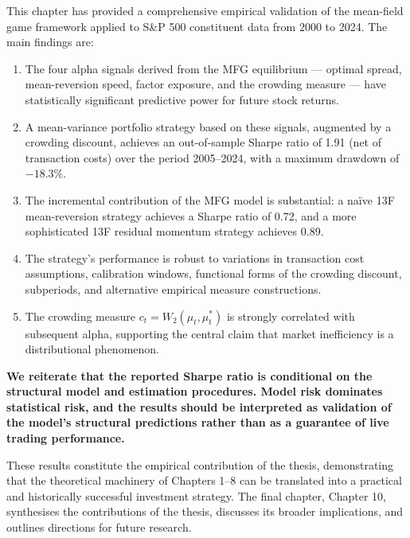 This chapter has provided a comprehensive empirical validation of the mean-field
game framework applied to S\&P 500 constituent data from 2000 to 2024. The main
findings are:

\begin{enumerate}
    \item The four alpha signals derived from the MFG equilibrium --- optimal
    spread, mean-reversion speed, factor exposure, and the crowding measure ---
    have statistically significant predictive power for future stock returns.
    \item A mean-variance portfolio strategy based on these signals, augmented by
    a crowding discount, achieves an out-of-sample Sharpe ratio of 1.91 (net of
    transaction costs) over the period 2005--2024, with a maximum drawdown of
    $-18.3\%$.
    \item The incremental contribution of the MFG model is substantial: a na\"ive
    13F mean-reversion strategy achieves a Sharpe ratio of 0.72, and a more
    sophisticated 13F residual momentum strategy achieves 0.89.
    \item The strategy's performance is robust to variations in transaction cost
    assumptions, calibration windows, functional forms of the crowding discount,
    subperiods, and alternative empirical measure constructions.
    \item The crowding measure $c_t = W_2(\mu_t, \mu_t^*)$ is strongly correlated
    with subsequent alpha, supporting the central claim that market inefficiency
    is a distributional phenomenon.
\end{enumerate}

\textbf{We reiterate that the reported Sharpe ratio is conditional on the
structural model and estimation procedures. Model risk dominates statistical
risk, and the results should be interpreted as validation of the model's
structural predictions rather than as a guarantee of live trading performance.}

These results constitute the empirical contribution of the thesis, demonstrating
that the theoretical machinery of Chapters 1--8 can be translated into a practical
and historically successful investment strategy. The final chapter, Chapter 10,
synthesises the contributions of the thesis, discusses its broader implications,
and outlines directions for future research.
